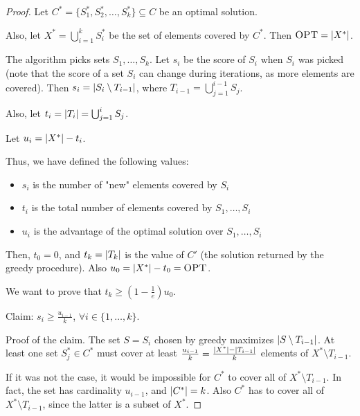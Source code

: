     \begin{proof}
        Let $C^* = \{ S_1^*, S_2^*, \dots, S_k^* \} \subseteq C$ be an optimal solution.

        Also, let $X^* = \bigcup_{i=1}^k S_i^*$ be the set of elements covered by $C^*$.
        Then $\textsc{OPT} = \vert X^* \vert$.

        The algorithm picks sets $S_1, \dots, S_k$.
        Let $s_i$ be the score of $S_i$ when $S_i$ was picked (note that the score of a set $S_i$ can change during iterations, as more elements are covered).
        Then $s_i = \vert S_i \setminus T_{i-1} \vert$, where $T_{i-1} = \bigcup_{j=1}^{i-1}S_j$.

        Also, let $t_i = \vert T_i \vert = \bigcup_{j=1}^{i}S_j$.

        Let $u_i = \vert X^* \vert - t_i$.

        Thus, we have defined the following values:
        \begin{itemize}
            \item $s_i$ is the number of "new" elements covered by $S_i$
            \item $t_i$ is the total number of elements covered by $S_1, \dots, S_i$
            \item $u_i$ is the advantage of the optimal solution over $S_1, \dots, S_i$
        \end{itemize}

        Then, $t_0 = 0$, and $t_k = \vert T_k \vert$ is the value of $C'$ (the solution returned by the greedy procedure).
        Also $u_0 = \vert X^* \vert - t_0 = \textsc{OPT}$.

        We want to prove that $t_k \geq (1 - \frac{1}{e})u_0$.

        Claim: $s_i \geq \frac{u_{i-1}}{k}$, $\forall i \in \{ 1, \dots, k \}$.

        Proof of the claim.
        The set $S = S_i$ chosen by greedy maximizes $\vert S \setminus T_{i-1} \vert$.
        At least one set $S_j^* \in C^*$ must cover at least $\frac{u_{i-1}}{k} = \frac{\vert X^* \vert - \vert T_{i-1} \vert}{k}$ elements of $X^* \setminus T_{i-1}$.

        If it was not the case, it would be impossible for $C^*$ to cover all of $X^* \setminus T_{i-1}$.
        In fact, the set has cardinality $u_{i-1}$, and $\vert C^* \vert = k$. Also $C^*$ has to cover all of $X^* \setminus T_{i-1}$, since the latter is a subset of $X^*$.


\end{proof}
